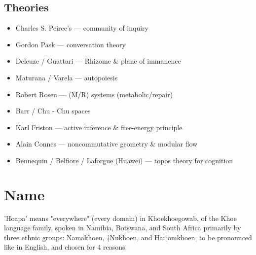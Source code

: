\documentclass[11pt]{article}
\begin{document}
\subsection{Theories}

\begin{itemize}

\item Charles S. Peirce's --- community of inquiry

\item Gordon Pask --- conversation theory

\item Deleuze / Guattari --- Rhizome \& plane of immanence

\item Maturana / Varela --- autopoiesis

\item Robert Rosen --- (M/R) systems (metabolic/repair)

\item Barr / Chu - Chu spaces

\item Karl Friston --- active inference \& free-energy principle

\item Alain Connes --- noncommutative geometry \& modular flow

\item Bennequin / Belfiore / Laforgue (Huawei) --- topos theory for cognition

\end{itemize}

\section{Name}

'Hoapa' means "everywhere" (every domain) in Khoekhoegowab, of the Khoe language family, spoken in Namibia, Botswana, and South Africa primarily by three ethnic groups: Namakhoen, \ensuremath{\ddagger}N\={u}khoen, and Hai\ensuremath{\Vert}omkhoen, to be pronounced like in English, and chosen for 4 reasons:
\end{document}
